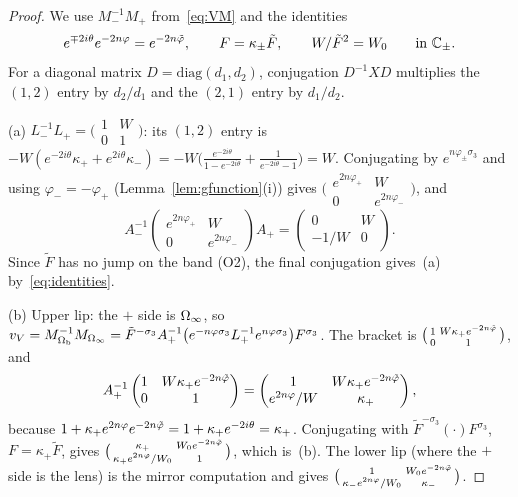 \begin{proof}
We use $M_-^{-1}M_+$ from~\eqref{eq:VM} and the identities
\begin{equation}\label{eq:identities}
  e^{\mp2i\theta}e^{-2n\varphi}=e^{-2n\tilde\varphi},\qquad F=\kappa_\pm\tilde F,\qquad W/\tilde F^2=W_0\qquad\text{in }\mathbb{C}_\pm .
\end{equation}
For a diagonal matrix $D=\mathrm{diag}(d_1,d_2)$, conjugation $D^{-1}XD$ multiplies the $(1,2)$ entry by $d_2/d_1$ and the
$(2,1)$ entry by $d_1/d_2$.

(a) $L_-^{-1}L_+=\bigl(\begin{smallmatrix}1&W\\0&1\end{smallmatrix}\bigr)$: its $(1,2)$ entry is
$-W(e^{-2i\theta}\kappa_++e^{2i\theta}\kappa_-)=-W\bigl(\frac{e^{-2i\theta}}{1-e^{-2i\theta}}+\frac1{e^{-2i\theta}-1}\bigr)=W$.
Conjugating by $e^{n\varphi_\pm\sigma_3}$ and using $\varphi_-=-\varphi_+$ (Lemma~\ref{lem:gfunction}(i)) gives
$\bigl(\begin{smallmatrix}e^{2n\varphi_+}&W\\0&e^{2n\varphi_-}\end{smallmatrix}\bigr)$, and
\[
  A_-^{-1}\begin{pmatrix}e^{2n\varphi_+}&W\\0&e^{2n\varphi_-}\end{pmatrix}A_+=\begin{pmatrix}0&W\\-1/W&0\end{pmatrix}.
\]
Since $\tilde F$ has no jump on the band (O2), the final conjugation gives~(a) by~\eqref{eq:identities}.

(b) Upper lip: the $+$ side is $\Omega_{\infty}$, so $v_V=M_{\Omega_{\mathrm{b}}}^{-1}M_{\Omega_{\infty}}=\tilde F^{-\sigma_3}A_+^{-1}\bigl(e^{-n\varphi\sigma_3}
L_+^{-1}e^{n\varphi\sigma_3}\bigr)F^{\sigma_3}$. The bracket is $\bigl(\begin{smallmatrix}1&W\kappa_+e^{-2n\tilde\varphi}\\0&1
\end{smallmatrix}\bigr)$, and
\[
  A_+^{-1}\begin{pmatrix}1&W\kappa_+e^{-2n\tilde\varphi}\\0&1\end{pmatrix}=
  \begin{pmatrix}1&W\kappa_+e^{-2n\tilde\varphi}\\e^{2n\varphi}/W&\kappa_+\end{pmatrix},
\]
because $1+\kappa_+e^{2n\varphi}e^{-2n\tilde\varphi}=1+\kappa_+e^{-2i\theta}=\kappa_+$. Conjugating with
$\tilde F^{-\sigma_3}(\cdot)F^{\sigma_3}$, $F=\kappa_+\tilde F$, gives
$\bigl(\begin{smallmatrix}\kappa_+&W_0e^{-2n\tilde\varphi}\\\kappa_+e^{2n\varphi}/W_0&1\end{smallmatrix}\bigr)$, which is~(b). The
lower lip (where the $+$ side is the lens) is the mirror computation and gives
$\bigl(\begin{smallmatrix}1&W_0e^{-2n\tilde\varphi}\\\kappa_-e^{2n\varphi}/W_0&\kappa_-\end{smallmatrix}\bigr)$.


\end{proof}
